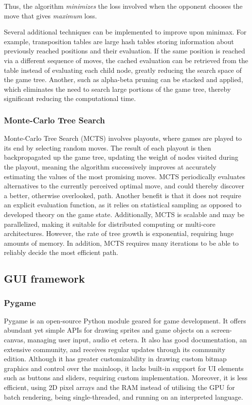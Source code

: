 \documentclass[../main/main.tex]{subfiles}
\begin{document}
Thus, the algorithm \textit{minimizes} the loss involved when the opponent chooses the move that gives \textit{maximum} loss.

Several additional techniques can be implemented to improve upon minimax. For example, transposition tables are large hash tables storing information about previously reached positions and their evaluation. If the same position is reached via a different sequence of moves, the cached evaluation can be retrieved from the table instead of evaluating each child node, greatly reducing the search space of the game tree. Another, such as alpha-beta pruning can be stacked and applied, which eliminates the need to search large portions of the game tree, thereby significant reducing the computational time.

\subsubsection*{Monte-Carlo Tree Search}
Monte-Carlo Tree Search (MCTS) involves playouts, where games are played to its end by selecting random moves. The result of each playout is then backpropagated up the game tree, updating the weight of nodes visited during the playout, meaning the algorithm successively improves at accurately estimating the values of the most promising moves. MCTS periodically evaluates alternatives to the currently perceived optimal move, and could thereby discover a better, otherwise overlooked, path. Another benefit is that it does not require an explicit evaluation function, as it relies on statistical sampling as opposed to developed theory on the game state. Additionally, MCTS is scalable and may be parallelized, making it suitable for distributed computing or multi-core architectures. However, the rate of tree growth is exponential, requiring huge amounts of memory. In addition, MCTS requires many iterations to be able to reliably decide the most efficient path.

\subsection{GUI framework}
\subsubsection*{Pygame}
Pygame is an open-source Python module geared for game development. It offers abundant yet simple APIs for drawing sprites and game objects on a screen-canvas, managing user input, audio et cetera. It also has good documentation, an extensive community, and receives regular updates through its community edition. Although it has greater customizability in drawing custom bitmap graphics and control over the mainloop, it lacks built-in support for UI elements such as buttons and sliders, requiring custom implementation. Moreover, it is less efficient, using 2D pixel arrays and the RAM instead of utilising the GPU for batch rendering, being single-threaded, and running on an interpreted language.
\end{document}
